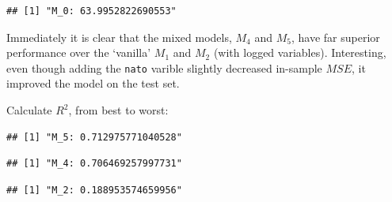 \documentclass[11pt,]{article}
\newenvironment{Shaded}{\begin{snugshade}}{\end{snugshade}}
\newcommand{\KeywordTok}[1]{\textcolor[rgb]{0.13,0.29,0.53}{\textbf{#1}}}
\newcommand{\NormalTok}[1]{#1}
\newcommand{\OperatorTok}[1]{\textcolor[rgb]{0.81,0.36,0.00}{\textbf{#1}}}
\newcommand{\StringTok}[1]{\textcolor[rgb]{0.31,0.60,0.02}{#1}}
\begin{document}
\begin{verbatim}
## [1] "M_0: 63.9952822690553"
\end{verbatim}

Immediately it is clear that the mixed models, \(M_4\) and \(M_5\), have
far superior performance over the `vanilla' \(M_1\) and \(M_2\) (with
logged variables). Interesting, even though adding the \texttt{nato}
varible slightly decreased in-sample \(MSE\), it improved the model on
the test set.

Calculate \(R^2\), from best to worst:

\begin{Shaded}
\end{Shaded}

\begin{verbatim}
## [1] "M_5: 0.712975771040528"
\end{verbatim}

\begin{Shaded}
\end{Shaded}

\begin{verbatim}
## [1] "M_4: 0.706469257997731"
\end{verbatim}

\begin{Shaded}
\end{Shaded}

\begin{verbatim}
## [1] "M_2: 0.188953574659956"
\end{verbatim}

\begin{Shaded}
\end{Shaded}
\end{document}
